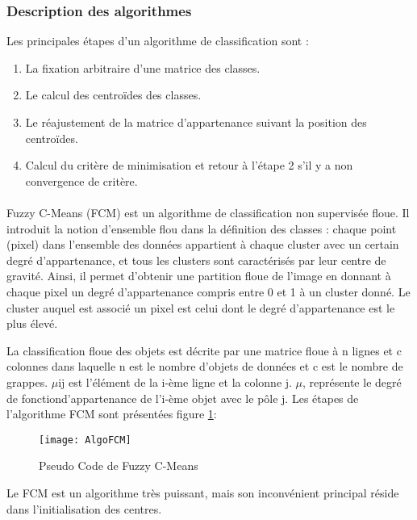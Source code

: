 \subsubsection*{Description des algorithmes}
Les principales étapes d'un algorithme de classification sont :
\begin{enumerate}
\item La fixation arbitraire d’une matrice des classes.
\item Le calcul des centroïdes des classes.
\item Le réajustement de la matrice d’appartenance suivant la position des centroïdes.
\item Calcul du critère de minimisation et retour à l’étape 2 s’il y a non convergence de critère.
\end{enumerate}
\paragraph{}

Fuzzy C-Means (FCM) est un algorithme de classification non supervisée floue. Il introduit la notion d’ensemble flou dans la définition des classes : chaque point (pixel) dans l’ensemble des données appartient à chaque cluster avec un certain degré d’appartenance, et tous les clusters sont caractérisés par leur centre de gravité. Ainsi, il permet d’obtenir une partition floue de l’image en donnant à chaque pixel un degré d’appartenance compris entre 0 et 1 à un cluster donné. Le cluster auquel est associé un pixel est celui dont le degré d’appartenance est le plus élevé.

La classification floue des objets est décrite par une matrice floue à n lignes et c colonnes dans laquelle n est le nombre d’objets de données et c est le nombre de grappes. $\mu$ij est l’élément de la i-ème ligne et la colonne j. $\mu$, représente le degré de fonctiond’appartenance de l’i-ème objet avec le pôle j.
Les étapes de l’algorithme FCM sont présentées figure \ref{fig:ALGOFCM}:

\begin{figure}[H]
  \centering
  \texttt{[image: AlgoFCM]}
  \caption{Pseudo Code de Fuzzy C-Means}
  \label{fig:ALGOFCM}
\end{figure}

Le FCM est un algorithme très puissant, mais son inconvénient principal réside dans l’initialisation des centres.


